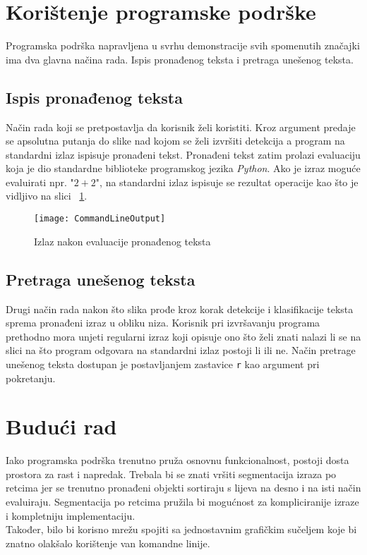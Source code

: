 \section{Korištenje programske podrške}
Programska podrška napravljena u svrhu demonstracije svih spomenutih značajki ima dva glavna načina rada.
Ispis pronađenog teksta i pretraga unešenog teksta.
\subsection{Ispis pronađenog teksta}
Način rada koji se pretpostavlja da korisnik želi koristiti.
Kroz argument predaje se apsolutna putanja do slike nad kojom se želi izvršiti detekcija a program na standardni izlaz ispisuje pronađeni tekst.
Pronađeni tekst zatim prolazi evaluaciju koja je dio standardne biblioteke programskog jezika \emph{Python}.
Ako je izraz moguće evaluirati npr. "$2 + 2$", na standardni izlaz ispisuje se rezultat operacije kao što je vidljivo na slici ~\ref{fig:output}.
\begin{figure}[h!]
	\centering
	\texttt{[image: CommandLineOutput]}
	 \caption{Izlaz nakon evaluacije pronađenog teksta}
 	 \label{fig:output}
\end{figure}
\subsection{Pretraga unešenog teksta}
Drugi način rada nakon što slika prođe kroz korak detekcije i klasifikacije teksta sprema pronađeni izraz u obliku niza.
Korisnik pri izvršavanju programa prethodno mora unjeti regularni izraz koji opisuje ono što želi znati nalazi li se na slici na što program odgovara na standardni izlaz postoji li ili ne.
Način pretrage unešenog teksta dostupan je postavljanjem zastavice \texttt{r} kao argument pri pokretanju.
\section{Budući rad}
Iako programska podrška trenutno pruža osnovnu funkcionalnost, postoji dosta prostora za rast i napredak.
Trebala bi se znati vršiti segmentacija izraza po retcima jer se trenutno pronađeni objekti sortiraju s lijeva na desno i na isti način evaluiraju.
Segmentacija po retcima pružila bi mogućnost za kompliciranije izraze i kompletniju implementaciju. \\
Također, bilo bi korisno mrežu spojiti sa jednostavnim grafičkim sučeljem koje bi znatno olakšalo korištenje van komandne linije.
